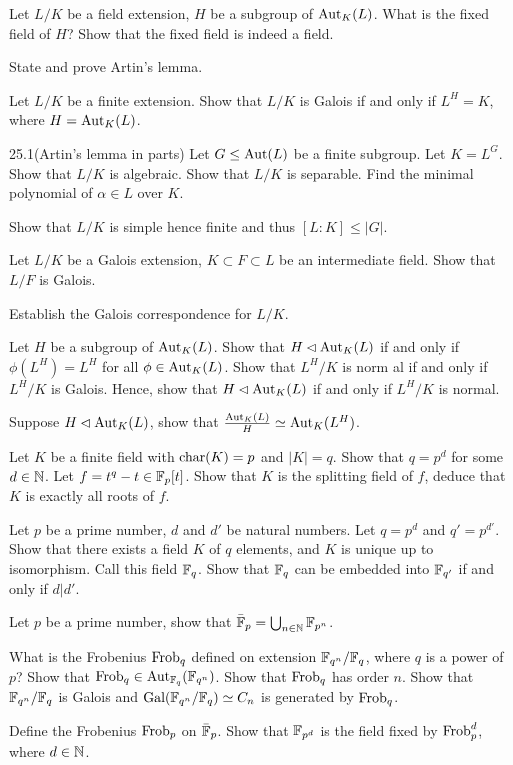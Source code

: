 \begin{question}{25}
    Let $L/K$ be a field extension, $H$ be a subgroup of $\text{Aut}_K(L)$. What is the fixed field of $H$? Show that the fixed field is indeed a field.

    State and prove Artin's lemma.

    Let $L/K$ be a finite extension. Show that $L/K$ is Galois if and only if $L^H = K$, where $H = \text{Aut}_K(L)$.
\end{question}

\begin{question}{25.1(Artin's lemma in parts)}
	Let $G \leq \text{Aut}(L)$ be a finite subgroup. Let $K = L^G$. Show that $L/K$ is algebraic. 
	Show that $L/K$ is separable. 
	Find the minimal polynomial of $\alpha \in L$ over $K$.
	
	Show that $L/K$ is simple hence finite and thus $[L:K] \leq |G|$.
\end{question}

\begin{question}{26}
    Let $L/K$ be a Galois extension, $K\subset F \subset L$ be an intermediate field. Show that $L/F$ is Galois.

    Establish the Galois correspondence for $L/K$. 

    Let $H$ be a subgroup of $\text{Aut}_K(L)$. Show that $H \lhd \text{Aut}_K(L)$ if and only if $\phi(L^H) = L^H$ for all $\phi \in \text{Aut}_K(L)$. Show that $L^H/K$ is norm al if and only if $L^H/K$ is Galois. Hence, show that $H \lhd \text{Aut}_K(L)$ if and only if $L^H/K$ is normal.

    Suppose $H \lhd \text{Aut}_K(L)$, show that $\frac{\text{Aut}_K(L)}{H} \simeq \text{Aut}_K(L^H)$.
\end{question}

\begin{question}{27}
    Let $K$ be a finite field  with $\text{char}(K) = p$ and $|K| = q$. Show that $q = p^d$ for some $d \in \mathbb{N}$. Let $f = t^q - t \in \mathbb{F}_p[t]$. Show that $K$ is the splitting field of $f$, deduce that $K$ is exactly all roots of $f$.

    Let $p$ be a prime number, $d$ and $d'$ be natural numbers. Let $q = p^d$ and $q' = p ^{d'}$. Show that there exists a field $K$ of $q$ elements, and $K$ is unique up to isomorphism. Call this field $\mathbb{F}_q$. Show that $\mathbb{F}_q$ can be embedded into $\mathbb{F}_{q'}$ if and only if $d|d'$.
\end{question}

\begin{question}{28}
    Let $p$ be a prime number, show that $\bar {\mathbb{F}}_p = \bigcup_{n \in \mathbb{N}} \mathbb{F}_{p^n}$.

    What is the Frobenius $\text{Frob}_q$ defined on extension $\mathbb{F}_{q^n}/\mathbb{F}_q$, where $q$ is a power of $p$? Show that $\text{Frob}_q \in \text{Aut}_{\mathbb{F}_q}(\mathbb{F}_{q^n})$. Show that $\text{Frob}_q$ has order $n$. Show that $\mathbb{F}_{q^n}/\mathbb{F}_q$ is Galois and $\text{Gal}(\mathbb{F}_{q^n}/\mathbb{F}_q) \simeq C_n$ is generated by $\text{Frob}_q$.

    Define the Frobenius $\text{Frob}_p$ on $\bar {\mathbb{F}}_p$. Show that $\mathbb{F}_{p^d}$ is the field fixed by $\text{Frob}_p^d$, where $d \in \mathbb{N}$.
\end{question}

